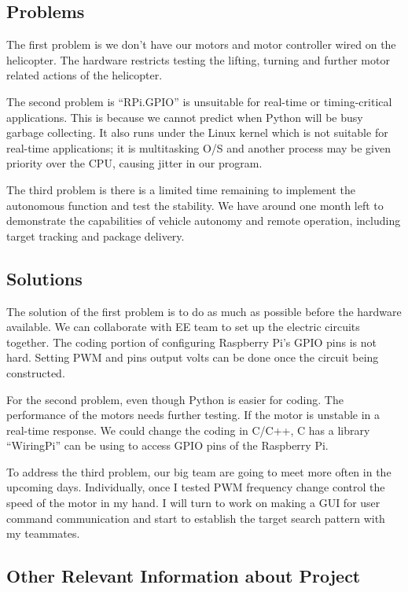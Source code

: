 \documentclass[onecolumn, draftclsnofoot,10pt, compsoc]{IEEEtran}
\begin{document}
\subsection{Problems}


The first problem is we don’t have our motors and motor controller wired on the helicopter. The hardware restricts testing the lifting, turning and further motor related actions of the helicopter.

The second problem is “RPi.GPIO” is unsuitable for real-time or timing-critical applications. This is because we cannot predict when Python will be busy garbage collecting. It also runs under the Linux kernel which is not suitable for real-time applications; it is multitasking O/S and another process may be given priority over the CPU, causing jitter in our program.

The third problem is there is a limited time remaining to implement the autonomous function and test the stability. We have around one month left to demonstrate the capabilities of vehicle autonomy and remote operation, including target tracking and package delivery.


\subsection{Solutions}


The solution of the first problem is to do as much as possible before the hardware available. We can collaborate with EE team to set up the electric circuits together. The coding portion of configuring Raspberry Pi’s GPIO pins is not hard. Setting PWM and pins output volts can be done once the circuit being constructed.

For the second problem, even though Python is easier for coding. The performance of the motors needs further testing. If the motor is unstable in a real-time response. We could change the coding in C/C++, C has a library “WiringPi” can be using to access GPIO pins of the Raspberry Pi.

To address the third problem, our big team are going to meet more often in the upcoming days. Individually, once I tested PWM frequency change control the speed of the motor in my hand. I will turn to work on making a GUI for user command communication and start to establish the target search pattern with my teammates.


\subsection{Other Relevant Information about Project}
\end{document}
